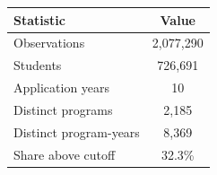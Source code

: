 \begin{tabular}{lc}
\toprule
Statistic & Value \\
\midrule
Observations &    2,077,290 \\
Students &      726,691 \\
Application years & 10 \\
Distinct programs &        2,185 \\
Distinct program-years &        8,369 \\
Share above cutoff & 32.3\% \\
\bottomrule
\end{tabular}
